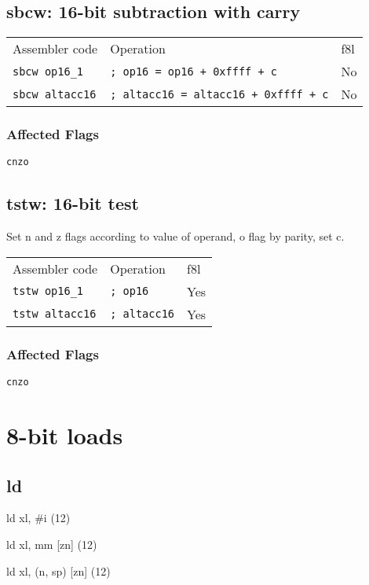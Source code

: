 \documentclass{book}
\begin{document}
\subsection{sbcw: 16-bit subtraction with carry}

\begin{tabular}{l l l}
Assembler code         & Operation                                   & f8l \\
\texttt{sbcw op16\_1}  & \texttt{; op16 = op16 + 0xffff + c}         & No \\
\texttt{sbcw altacc16} & \texttt{; altacc16 = altacc16 + 0xffff + c} & No
\end{tabular}

\subsubsection*{Affected Flags}

\texttt{cnzo}


\subsection{tstw: 16-bit test}

Set n and z flags according to value of operand, o flag by parity, set c.

\begin{tabular}{l l l}
Assembler code         & Operation           & f8l \\
\texttt{tstw op16\_1}  & \texttt{; op16}     & Yes \\
\texttt{tstw altacc16} & \texttt{; altacc16} & Yes
\end{tabular}

\subsubsection*{Affected Flags}

\texttt{cnzo}


\section{8-bit loads}

\subsection{ld}

ld xl, \#i (12)

ld xl, mm [zn] (12)

ld xl, (n, sp) [zn] (12)
\end{document}
